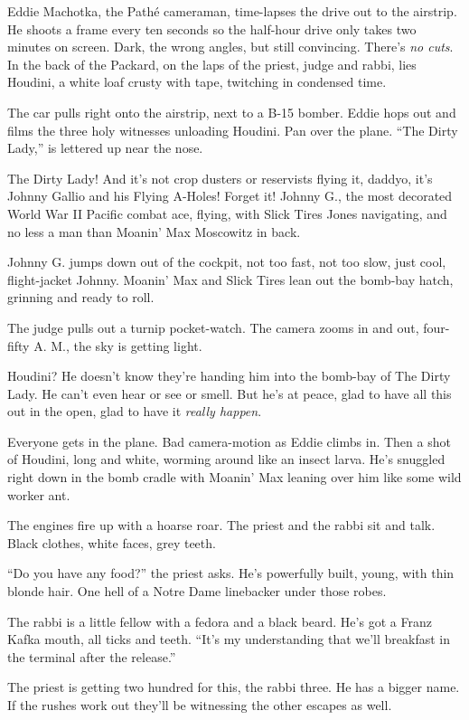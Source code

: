 Eddie Machotka, the Pathé cameraman, time-lapses the drive out to the airstrip. He shoots a frame every ten seconds so the half-hour drive only takes two minutes on screen. Dark, the wrong angles, but still convincing. There's \textit{no cuts}. In the back of the Packard, on the laps of the priest, judge and rabbi, lies Houdini, a white loaf crusty with tape, twitching in condensed time.

The car pulls right onto the airstrip, next to a B-15 bomber. Eddie hops out and films the three holy witnesses unloading Houdini. Pan over the plane. ``The Dirty Lady,'' is lettered up near the nose.

The Dirty Lady! And it's not crop dusters or reservists flying it, daddyo, it's Johnny Gallio and his Flying A-Holes! Forget it! Johnny G., the most decorated World War II Pacific combat ace, flying, with Slick Tires Jones navigating, and no less a man than Moanin' Max Moscowitz in back.

Johnny G. jumps down out of the cockpit, not too fast, not too slow, just cool, flight-jacket Johnny. Moanin' Max and Slick Tires lean out the bomb-bay hatch, grinning and ready to roll.

The judge pulls out a turnip pocket-watch. The camera zooms in and out, four-fifty A. M., the sky is getting light.

Houdini? He doesn't know they're handing him into the bomb-bay of The Dirty Lady. He can't even hear or see or smell. But he's at peace, glad to have all this out in the open, glad to have it \textit{really happen}.

Everyone gets in the plane. Bad camera-motion as Eddie climbs in. Then a shot of Houdini, long and white, worming around like an insect larva. He's snuggled right down in the bomb cradle with Moanin' Max leaning over him like some wild worker ant.

The engines fire up with a hoarse roar. The priest and the rabbi sit and talk. Black clothes, white faces, grey teeth.

``Do you have any food?'' the priest asks. He's powerfully built, young, with thin blonde hair. One hell of a Notre Dame linebacker under those robes.

The rabbi is a little fellow with a fedora and a black beard. He's got a Franz Kafka mouth, all ticks and teeth. ``It's my understanding that we'll breakfast in the terminal after the release.''

The priest is getting two hundred for this, the rabbi three. He has a bigger name. If the rushes work out they'll be witnessing the other escapes as well.

